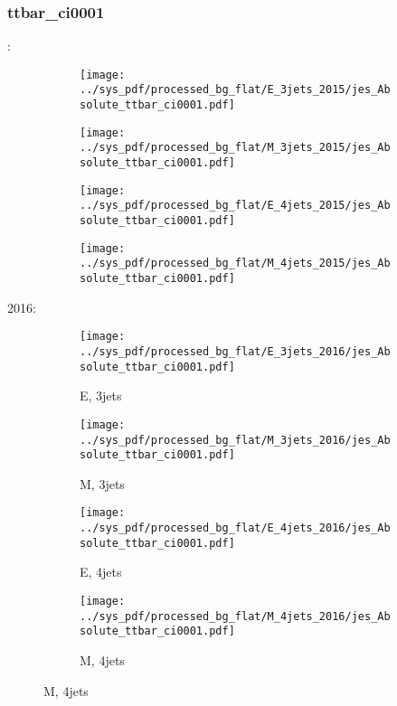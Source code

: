 \documentclass{beamer}
\begin{document}
\begin{frame}
\frametitle{ttbar_ci0001}
\fontsize{5}{1}:
\begin{figure}
\centering
\begin{subfigure}[b]{0.24\textwidth}
\texttt{[image: ../sys\_pdf/processed\_bg\_flat/E\_3jets\_2015/jes\_Absolute\_ttbar\_ci0001.pdf]}
\end{subfigure}
\begin{subfigure}[b]{0.24\textwidth}
\texttt{[image: ../sys\_pdf/processed\_bg\_flat/M\_3jets\_2015/jes\_Absolute\_ttbar\_ci0001.pdf]}
\end{subfigure}
\begin{subfigure}[b]{0.24\textwidth}
\texttt{[image: ../sys\_pdf/processed\_bg\_flat/E\_4jets\_2015/jes\_Absolute\_ttbar\_ci0001.pdf]}
\end{subfigure}
\begin{subfigure}[b]{0.24\textwidth}
\texttt{[image: ../sys\_pdf/processed\_bg\_flat/M\_4jets\_2015/jes\_Absolute\_ttbar\_ci0001.pdf]}
\end{subfigure}
\end{figure}
2016:
\begin{figure}
\centering
\begin{subfigure}[b]{0.24\textwidth}
\texttt{[image: ../sys\_pdf/processed\_bg\_flat/E\_3jets\_2016/jes\_Absolute\_ttbar\_ci0001.pdf]}
\captionsetup{font=tiny}
\caption{E, 3jets}
\end{subfigure}
\begin{subfigure}[b]{0.24\textwidth}
\texttt{[image: ../sys\_pdf/processed\_bg\_flat/M\_3jets\_2016/jes\_Absolute\_ttbar\_ci0001.pdf]}
\captionsetup{font=tiny}
\caption{M, 3jets}
\end{subfigure}
\begin{subfigure}[b]{0.24\textwidth}
\texttt{[image: ../sys\_pdf/processed\_bg\_flat/E\_4jets\_2016/jes\_Absolute\_ttbar\_ci0001.pdf]}
\captionsetup{font=tiny}
\caption{E, 4jets}
\end{subfigure}
\begin{subfigure}[b]{0.24\textwidth}
\texttt{[image: ../sys\_pdf/processed\_bg\_flat/M\_4jets\_2016/jes\_Absolute\_ttbar\_ci0001.pdf]}
\captionsetup{font=tiny}
\caption{M, 4jets}
\end{subfigure}
\end{figure}
\end{frame}
\end{document}
